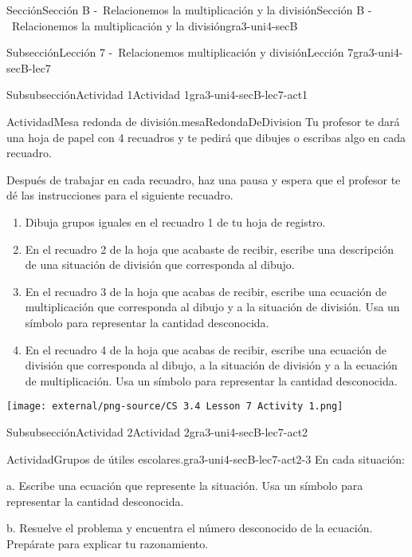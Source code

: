 \documentclass[twoside,14pt,]{extarticle}
\begin{document}
\begin{sectionptx}{Sección}{Sección B -~Relacionemos la multiplicación y la división}{}{Sección B -~Relacionemos la multiplicación y la división}{}{}{gra3-uni4-secB}
\begin{subsectionptx}{Subsección}{Lección 7 -~Relacionemos multiplicación y división}{}{Lección 7}{}{}{gra3-uni4-secB-lec7}
\typeout{************************************************}
%
\begin{subsubsectionptx}{Subsubsección}{Actividad 1}{}{Actividad 1}{}{}{gra3-uni4-secB-lec7-act1}
\begin{activity}{Actividad}{Mesa redonda de división.}{mesaRedondaDeDivision}%
Tu profesor te dará una hoja de papel con 4 recuadros y te pedirá que dibujes o escribas algo en cada recuadro.%
\par
Después de trabajar en cada recuadro, haz una pausa y espera que el profesor te dé las instrucciones para el siguiente recuadro.%
%
\begin{enumerate}
\item{}Dibuja grupos iguales en el recuadro 1 de tu hoja de registro.%
\item{}En el recuadro 2 de la hoja que acabaste de recibir, escribe una descripción de una situación de división que corresponda al dibujo.%
\item{}En el recuadro 3 de la hoja que acabas de recibir, escribe una ecuación de multiplicación que corresponda al dibujo y a la situación de división. Usa un símbolo para representar la cantidad desconocida.%
\item{}En el recuadro 4 de la hoja que acabas de recibir, escribe una ecuación de división que corresponda al dibujo, a la situación de división y a la ecuación de multiplicación. Usa un símbolo para representar la cantidad desconocida.%
\end{enumerate}
\begin{image}{0.2}{0.6}{0.2}{}%
\texttt{[image: external/png-source/CS 3.4 Lesson 7 Activity 1.png]}
\end{image}%
\end{activity}%
\end{subsubsectionptx}
%
%
\typeout{************************************************}
\typeout{************************************************}
%
\begin{subsubsectionptx}{Subsubsección}{Actividad 2}{}{Actividad 2}{}{}{gra3-uni4-secB-lec7-act2}
\begin{activity}{Actividad}{Grupos de útiles escolares.}{gra3-uni4-secB-lec7-act2-3}%
En cada situación:%
\par
a. Escribe una ecuación que represente la situación. Usa un símbolo para representar la cantidad desconocida.%
\par
b. Resuelve el problema y encuentra el número desconocido de la ecuación. Prepárate para explicar tu razonamiento.%

\end{activity}
\end{subsubsectionptx}
\end{subsectionptx}
\end{sectionptx}
\end{document}
